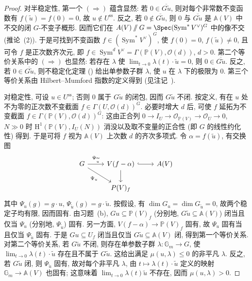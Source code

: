 \begin{proof}
对半稳定性, 第一个 $(\Rightarrow)$ 蕴含显然: 若 $0\in\overline{G\widetilde u}$, 则对每个非常数不变函数有 $f(\widetilde u)=f(0)=0$, 故 $u\notin U^{\mathrm{ss}}$. 反之, 若 $0\notin\overline{G\widetilde u}$, 则 $0$ 与 $\overline{G\widetilde u}$ 是 $\mathbb A(V)$ 中不交的闭 $G$-不变子概形. 因而它们在 $\mathbb A(V)\sslash G=\Spec(\operatorname{Sym}^*V^\vee)^G$ 中的像不交 (推论~(2)). 于是可找到不变函数 $f\in(\operatorname{Sym}^*V^\vee)^G$, 使 $f(0)=0$, $f(\widetilde u)\ne0$, 且可令 $f$ 是正次数齐次元, 即 $f\in\operatorname{Sym}^dV^\vee=\Gamma(\mathbb P(V),\mathcal O(d))$, $d>0$. 第二个等价关系中的 $(\Rightarrow)$ 也显然: 若存在 $\lambda$ 使 $\lim_{t\to0}\lambda(t)\cdot\widetilde u=0$, 则 $0\in\overline{G\widetilde u}$. 反之, 若 $0\in\overline{G\widetilde u}$, 则不稳定化定理 () 给出单参数子群 $\lambda$, 使 $u$ 在 $\lambda$ 下的极限为 $0$. 第三个等价关系由 Hilbert--Mumford 指数的定义得到 (见注记~).

对稳定性, 可设 $u\in U^{\mathrm{ss}}$; 否则 $0$ 属于 $G\widetilde u$ 的闭包, 因而 $G\widetilde u$ 不闭. 按定义, 有在 $u$ 处不为零的正次数不变截面 $f\in\Gamma(U,\mathcal O(d))^G$. 必要时增大 $d$ 后, 可使 $f$ 延拓为不变截面 $f\in\Gamma(\mathbb P(V),\mathcal O(d))^G$: 这由正合列 $0\to I_U\to\mathcal O_{\mathbb P(V)}\to\mathcal O_U\to0$, $N\gg0$ 时 $\mathrm H^1(\mathbb P(V),I_U(N))$ 消没以及取不变量的正合性 (即 $G$ 的线性约化性) 得到. 于是可将 $f$ 视为 $\mathbb A(V)$ 上次数 $d$ 的齐次多项式. 令 $\alpha=f(\widetilde u)$, 有交换图
\[
\begin{tikzcd}[ampersand replacement=\&]
G\arrow[r,"\Psi_{\widetilde u}"]\arrow[dr,"\Psi_u"']\&{V(f-\alpha)}\arrow[r,hook]\arrow[d]\&\mathbb A(V)\\
{}\&\mathbb P(V)_f\&{}
\end{tikzcd}
\]
其中 $\Psi_u(g)=g\cdot u$, $\Psi_{\widetilde u}(g)=g\cdot\widetilde u$. 按假设, 有 $\dim G_u=\dim G_{\widetilde u}=0$, 故两个稳定子均有限, 因而固有. 由习题~(b), $Gu\subseteq\mathbb P(V)_f$ (分别地, $G\widetilde u\subseteq\mathbb A(V)$) 闭当且仅当 $\Psi_u$ (分别地, $\Psi_{\widetilde u}$) 固有. 另一方面, $V(f-\alpha)\to\mathbb P(V)_f$ 固有, 故 $\Psi_u$ 固有当且仅当 $\Psi_{\widetilde u}$ 固有. 于是 $Gu\subseteq U_f$ 闭当且仅当 $G\widetilde u\subseteq\mathbb A(V)$ 闭, 得到第一个等价关系. 对第二个等价关系, 若 $G\widetilde u$ 不闭, 则存在单参数子群 $\lambda:\mathbb G_m\to G$, 使 $\lim_{t\to0}\lambda(t)\cdot\widetilde u$ 存在且不属于 $G\widetilde u$. 这给出满足 $\mu(u,\lambda)\leq0$ 的非平凡 $\lambda$. 反之, 若 $G\widetilde u$ 闭, 则 $\Psi_{\widetilde u}$ 固有, 故对每个非平凡 $\lambda$, 由 $t\mapsto\lambda(t)\cdot\widetilde u$ 定义的映射 $\mathbb G_m\to\mathbb A(V)$ 也固有; 这意味着 $\lim_{t\to0}\lambda(t)\widetilde u$ 不存在, 因而 $\mu(u,\lambda)>0$.
\end{proof}
